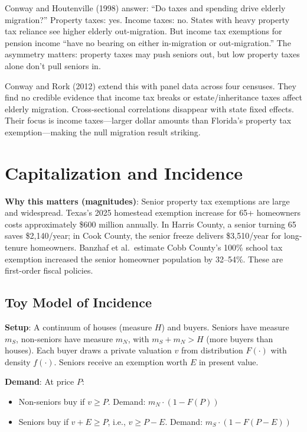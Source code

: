 \documentclass[11pt]{article}
\begin{document}
Conway and Houtenville (1998) answer: ``Do taxes and spending drive elderly migration?'' Property taxes: yes. Income taxes: no. States with heavy property tax reliance see higher elderly out-migration. But income tax exemptions for pension income ``have no bearing on either in-migration or out-migration.'' The asymmetry matters: property taxes may push seniors out, but low property taxes alone don't pull seniors in.

Conway and Rork (2012) extend this with panel data across four censuses. They find no credible evidence that income tax breaks or estate/inheritance taxes affect elderly migration. Cross-sectional correlations disappear with state fixed effects. Their focus is income taxes---larger dollar amounts than Florida's property tax exemption---making the null migration result striking.

\section{Capitalization and Incidence}
\label{sec:capitalization}

\textbf{Why this matters (magnitudes)}: Senior property tax exemptions are large and widespread. Texas's 2025 homestead exemption increase for 65+ homeowners costs approximately \$600 million annually. In Harris County, a senior turning 65 saves \$2,140/year; in Cook County, the senior freeze delivers \$3,510/year for long-tenure homeowners. Banzhaf et al.\ estimate Cobb County's 100\% school tax exemption increased the senior homeowner population by 32--54\%. These are first-order fiscal policies.

\subsection{Toy Model of Incidence}

\textbf{Setup}: A continuum of houses (measure $H$) and buyers. Seniors have measure $m_S$, non-seniors have measure $m_N$, with $m_S + m_N > H$ (more buyers than houses). Each buyer draws a private valuation $v$ from distribution $F(\cdot)$ with density $f(\cdot)$. Seniors receive an exemption worth $E$ in present value.

\textbf{Demand}: At price $P$:
\begin{itemize}
    \item Non-seniors buy if $v \geq P$. Demand: $m_N \cdot (1 - F(P))$
    \item Seniors buy if $v + E \geq P$, i.e., $v \geq P - E$. Demand: $m_S \cdot (1 - F(P - E))$
\end{itemize}
\end{document}
